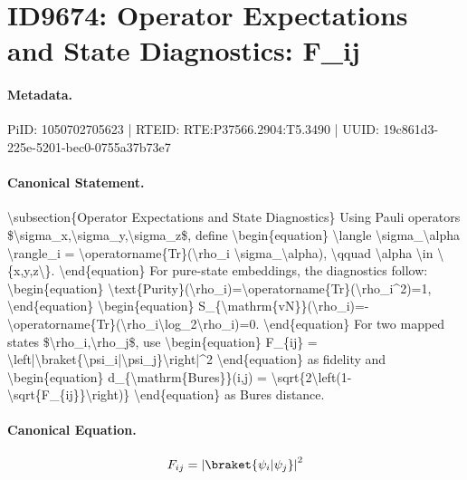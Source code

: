 \section*{ID9674: Operator Expectations and State Diagnostics: F\_ij}
\paragraph{Metadata.}
PiID: 1050702705623 | RTEID: RTE:P37566.2904:T5.3490 | UUID: 19c861d3-225e-5201-bec0-0755a37b73e7

\paragraph{Canonical Statement.}
\textbackslash{}subsection\{Operator Expectations and State Diagnostics\} Using Pauli operators \$\textbackslash{}sigma\_x,\textbackslash{}sigma\_y,\textbackslash{}sigma\_z\$, define \textbackslash{}begin\{equation\} \textbackslash{}langle \textbackslash{}sigma\_\textbackslash{}alpha \textbackslash{}rangle\_i = \textbackslash{}operatorname\{Tr\}(\textbackslash{}rho\_i \textbackslash{}sigma\_\textbackslash{}alpha), \textbackslash{}qquad \textbackslash{}alpha \textbackslash{}in \textbackslash{}\{x,y,z\textbackslash{}\}. \textbackslash{}end\{equation\} For pure-state embeddings, the diagnostics follow: \textbackslash{}begin\{equation\} \textbackslash{}text\{Purity\}(\textbackslash{}rho\_i)=\textbackslash{}operatorname\{Tr\}(\textbackslash{}rho\_i\textasciicircum{}2)=1, \textbackslash{}end\{equation\} \textbackslash{}begin\{equation\} S\_\{\textbackslash{}mathrm\{vN\}\}(\textbackslash{}rho\_i)=-\textbackslash{}operatorname\{Tr\}(\textbackslash{}rho\_i\textbackslash{}log\_2\textbackslash{}rho\_i)=0. \textbackslash{}end\{equation\} For two mapped states \$\textbackslash{}rho\_i,\textbackslash{}rho\_j\$, use \textbackslash{}begin\{equation\} F\_\{ij\} = \textbackslash{}left|\textbackslash{}braket\{\textbackslash{}psi\_i|\textbackslash{}psi\_j\}\textbackslash{}right|\textasciicircum{}2 \textbackslash{}end\{equation\} as fidelity and \textbackslash{}begin\{equation\} d\_\{\textbackslash{}mathrm\{Bures\}\}(i,j) = \textbackslash{}sqrt\{2\textbackslash{}left(1-\textbackslash{}sqrt\{F\_\{ij\}\}\textbackslash{}right)\} \textbackslash{}end\{equation\} as Bures distance.

\paragraph{Canonical Equation.}
\[
F_{ij} = \left|\braket{\psi_i|\psi_j}\right|^2
\]

